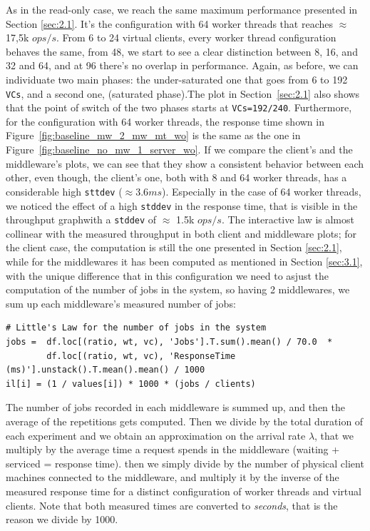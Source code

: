 \documentclass[11pt,a4paper]{article}
\begin{document}
As in the read-only case, we reach the same maximum performance presented in Section \ref{sec:2.1}. It's the configuration with 64 worker threads that reaches $\approx$ 17,5k $ops/s$. From 6 to 24 virtual clients, every worker thread configuration behaves the same, from 48, we start to see a clear distinction between 8, 16, and 32 and 64, and at 96 there's no overlap in performance. Again, as before, we can individuate two main phases: the under-saturated one that goes from 6 to 192 \texttt{VCs}, and a second one, (saturated phase).The plot in Section~\ref{sec:2.1} also shows that the point of switch of the two phases starts at \texttt{VCs=192/240}. 
Furthermore, for the configuration with 64 worker threads, the response time shown in Figure~\ref{fig:baseline_mw_2_mw_mt_wo} is the same as the one in Figure~\ref{fig:baseline_no_mw_1_server_wo}.
If we compare the client's and the middleware's plots, we can see that they show a consistent behavior between each other, even though, the client's one, both with 8 and 64 worker threads, has a considerable high \texttt{sttdev} ($\approx 3.6ms$). Especially in the case of 64 worker threads, we noticed the effect of a high \texttt{stddev} in the response time, that is visible in the throughput graphwith a \texttt{stddev} of $\approx$ 1.5k $ops/s$.
The interactive law is almost collinear with the measured throughput in both client and middleware plots; for the client case, the computation is still the one presented in Section \ref{sec:2.1}, while for the middlewares it has been computed as mentioned in Section \ref{sec:3.1}, with the unique difference that in this configuration we need to asjust the computation of the number of jobs in the system, so having 2 middlewares, we sum up each middleware's measured number of jobs:

\begin{lstlisting}[]
# Little's Law for the number of jobs in the system
jobs =  df.loc[(ratio, wt, vc), 'Jobs'].T.sum().mean() / 70.0  * 
        df.loc[(ratio, wt, vc), 'ResponseTime (ms)'].unstack().T.mean().mean() / 1000
il[i] = (1 / values[i]) * 1000 * (jobs / clients) 
\end{lstlisting}

The number of jobs recorded in each middleware is summed up, and then the average of the repetitions gets computed. Then we divide by the total duration of each experiment and we obtain an approximation on the arrival rate $\lambda$, that we multiply by the average time a request spends in the middleware (waiting + serviced = response time). then we simply divide by the number of physical client machines connected to the middleware, and multiply it by the inverse of the measured response time for a distinct configuration of worker threads and virtual clients. Note that both measured times are converted to \textit{seconds}, that is the reason we divide by 1000.
\end{document}
